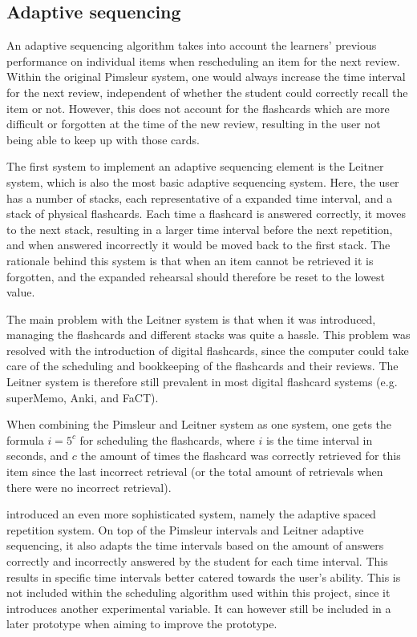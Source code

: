         \subsection{Adaptive sequencing}
        \label{subsec:adaptivesequencing}

An adaptive sequencing algorithm takes into account the learners' previous performance on individual items when rescheduling an item for the next review. Within the original Pimsleur system, one would always increase the time interval for the next review, independent of whether the student could correctly recall the item or not. However, this does not account for the flashcards which are more difficult or forgotten at the time of the new review, resulting in the user not being able to keep up with those cards.

The first system to implement an adaptive sequencing element is the Leitner system, which is also the most basic adaptive sequencing system. Here, the user has a number of stacks, each representative of a expanded time interval, and a stack of physical flashcards. Each time a flashcard is answered correctly, it moves to the next stack, resulting in a larger time interval before the next repetition, and when answered incorrectly it would be moved back to the first stack. The rationale behind this system is that when an item cannot be retrieved it is forgotten, and the expanded rehearsal should therefore be reset to the lowest value.

The main problem with the Leitner system is that when it was introduced, managing the flashcards and different stacks was quite a hassle. This problem was resolved with the introduction of digital flashcards, since the computer could take care of the scheduling and bookkeeping of the flashcards and their reviews. The Leitner system is therefore still prevalent in most digital flashcard systems (e.g. superMemo, Anki, and FaCT).

When combining the Pimsleur and Leitner system as one system, one gets the formula $i = 5^c$ for scheduling the flashcards, where $i$ is the time interval in seconds, and $c$ the amount of times the flashcard was correctly retrieved for this item since the last incorrect retrieval (or the total amount of retrievals when there were no incorrect retrieval).

 introduced an even more sophisticated system, namely the adaptive spaced repetition system. On top of the Pimsleur intervals and Leitner adaptive sequencing, it also adapts the time intervals based on the amount of answers correctly and incorrectly answered by the student for each time interval. This results in specific time intervals better catered towards the user's ability. This is not included within the scheduling algorithm used within this project, since it introduces another experimental variable. It can however still be included in a later prototype when aiming to improve the prototype.

